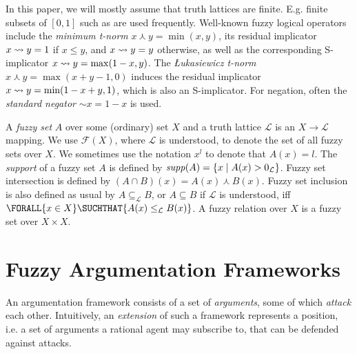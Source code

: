 \documentclass[12pt,a4paper]{article}
\newcommand{\Forall}[2]{\ensuremath{\FORALL{#1} \SUCHTHAT {#2}}}
\newcommand{\mc}[1]{\ensuremath{\mathcal{#1}}}
\newcommand{\Fuzzy}[1]{\ensuremath{\mc{F}({#1})}}
\newcommand{\ssupport}[1]{\ensuremath{\mathit{supp}({#1})}}
\newcommand{\Lattice}{\ensuremath{\mc{L}}}
\newcommand{\fand}{\ensuremath{\curlywedge}}
\newcommand{\fneg}{\ensuremath{\sim}}
\newcommand{\fullimg}[2]{\ensuremath{{}^{#2}{#1}}}
\newcommand{\subdirectimg}[2]{\ensuremath{{}_{#2}{#1}}}
\begin{document}
In this paper, we will mostly assume that truth lattices are finite.
E.g. finite subsets of $[0,1]$ such as  are used frequently. Well-known fuzzy logical operators include
the \emph{minimum t-norm} $x \fand y = \min(x,y)$, its residual implicator $x
\rightsquigarrow y = 1$ if $x \leq y$, and $x \rightsquigarrow y = y$ otherwise, as well as
the corresponding S-implicator $x \rightsquigarrow y = \max(1-x,y)$. The
\emph{{\L}ukasiewicz t-norm} $x \fand y = \max(x+y-1,0)$ induces the residual
implicator $x \rightsquigarrow y = \min(1-x+y,1)$, which is also an S-implicator.
For negation, often the \emph{standard negator} $\fneg x = 1-x$ is used. 

A \emph{fuzzy set} $A$ over some (ordinary) set $X$ and a truth lattice
\Lattice{} is an $X \rightarrow \Lattice{}$ mapping. We use \Fuzzy{X},
where \Lattice{} is understood,
to denote the set of all fuzzy sets over $X$.
We sometimes use the notation $x^l$ to denote that $A(x) = l$.
The \emph{support} of a fuzzy set $A$ is defined by
$\ssupport{A} = \set{x \mid A(x) > 0_\Lattice}$.
Fuzzy set intersection is defined by $(A \cap B)(x) = A(x) \fand B(x)$. Fuzzy set inclusion is also defined as usual by $A \subseteq_{\Lattice} B$, or $A \subseteq B$ if \Lattice{} is understood, iff \Forall{x\in X}{A(x) \leq_{\Lattice} B(x)}.
A fuzzy relation over $X$ is a fuzzy set over $X \times X$.


%
%

\section{Fuzzy Argumentation Frameworks}\label{sec-faf}

An argumentation framework\cite{dung95} consists of a set of
\emph{arguments}, some of which \emph{attack} each other. Intuitively,
an \emph{extension} of such a framework represents a position, i.e.
a set of arguments a rational agent may subscribe to, that
can be defended against attacks. 
\end{document}
